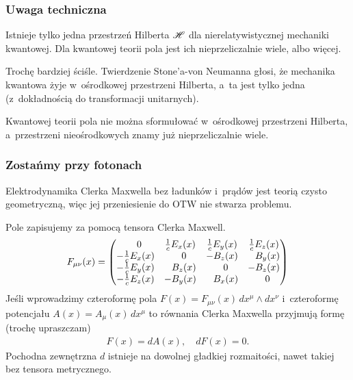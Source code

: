 \documentclass[10pt,t]{beamer}
\begin{document}
\begin{frame}
  \frametitle{Uwaga techniczna}


  Istnieje tylko \alert{jedna} przestrzeń Hilberta $\mathcal{H}$ dla
  nierelatywistycznej mechaniki kwantowej. Dla kwantowej teorii pola
  jest ich nieprzeliczalnie wiele, albo więcej.

  Trochę bardziej ściśle. Twierdzenie Stone'a-von Neumanna głosi, że
  mechanika kwantowa żyje w~ośrodkowej przestrzeni Hilberta, a~ta jest
  tylko jedna (z~dokładnością do transformacji unitarnych).

  Kwantowej teorii pola nie można sformułować w~ośrodkowej przestrzeni
  Hilberta, a~przestrzeni nieośrodkowych znamy już nieprzeliczalnie
  wiele.

\end{frame}





\begin{frame}
  \frametitle{Zostańmy przy fotonach}


  Elektrodynamika Clerka Maxwella bez ładunków i~prądów jest teorią
  czysto geometryczną, więc jej przeniesienie do OTW nie stwarza
  problemu.

  Pole zapisujemy za pomocą tensora Clerka Maxwell.
  \begin{equation}
    \label{eq:Czemu-rozwazanie-01}
    F_{ \mu \nu }( x )
    =
    \begin{pmatrix}
      \hphantom{-} 0
      & \frac{ 1 }{ c } E_{ x }( x ) & \frac{ 1 }{ c } E_{ y }( x )
      & \frac{ 1 }{ c } E_{ z }( x ) \\
      -\frac{ 1 }{ c } E_{ x }( x )
      & \hphantom{-} 0 & -B_{ z }( x ) & \hphantom{-} B_{ y }( x ) \\
      -\frac{ 1 }{ c } E_{ y }( x )
      & \hphantom{-} B_{ z }( x ) & \hphantom{-} 0 & -B_{ z }( x ) \\
      -\frac{ 1 }{ c } E_{ z }( x )
      & -B_{ y }( x ) & \hphantom{-} B_{ x }( x ) & \hphantom{-} 0
    \end{pmatrix}
  \end{equation}
  Jeśli wprowadzimy czteroformę pola
  $F( x ) = F_{ \mu \nu }( x ) \, dx^{ \mu } \wedge dx^{ \nu }$
  i~czteroformę potencjału $A( x ) = A_{ \mu }( x ) \, dx^{ \mu }$ to
  równania Clerka Maxwella przyjmują formę (trochę upraszczam)
  \begin{align*}
    F( x ) = dA( x ), \quad dF( x ) = 0.
  \end{align*}
  Pochodna zewnętrzna $d$ istnieje na dowolnej gładkiej rozmaitości,
  nawet takiej bez tensora metrycznego.

\end{frame}
\end{document}
